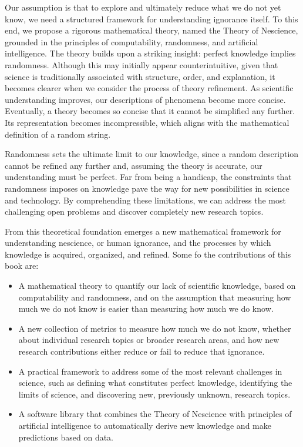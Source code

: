 Our assumption is that to explore and ultimately reduce what we do not yet know, we need a structured framework for understanding ignorance itself. To this end, we propose a rigorous mathematical theory, named the Theory of Nescience, grounded in the principles of computability, randomness, and artificial intelligence. The theory builds upon a striking insight: perfect knowledge implies randomness. Although this may initially appear counterintuitive, given that science is traditionally associated with structure, order, and explanation, it becomes clearer when we consider the process of theory refinement. As scientific understanding improves, our descriptions of phenomena become more concise.  Eventually, a theory becomes so concise that it cannot be simplified any further. Its representation becomes incompressible, which aligns with the mathematical definition of a random string.

Randomness sets the ultimate limit to our knowledge, since a random description cannot be refined any further and, assuming the theory is accurate, our understanding must be perfect. Far from being a handicap, the constraints that randomness imposes on knowledge pave the way for new possibilities in science and technology. By comprehending these limitations, we can address the most challenging open problems and discover completely new research topics.

From this theoretical foundation emerges a new mathematical framework for understanding nescience, or human ignorance, and the processes by which knowledge is acquired, organized, and refined. Some fo the contributions of this book are:

\medskip

\begin{itemize}
 
\item A mathematical theory to quantify our lack of scientific knowledge, based on computability and randomness, and on the assumption that measuring how much we do not know is easier than measuring how much we do know.

\item A new collection of metrics to measure how much we do not know, whether about individual research topics or broader research areas, and how new research contributions either reduce or fail to reduce that ignorance.

\item A practical framework to address some of the most relevant challenges in science, such as defining what constitutes perfect knowledge, identifying the limits of science, and discovering new, previously unknown, research topics.

\item A software library that combines the Theory of Nescience with principles of artificial intelligence to automatically derive new knowledge and make predictions based on data.

\end{itemize}

